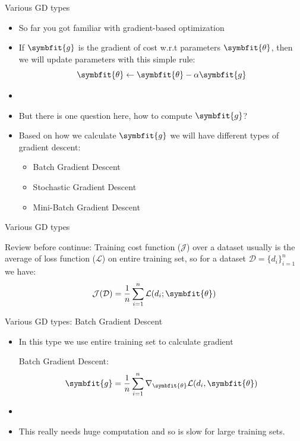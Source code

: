 \begin{frame}{Various GD types}
    \begin{itemize}
    	\item So far you got familiar with gradient-based optimization
    	\item If $\symbfit{g}$ is the gradient of cost w.r.t parameters $\symbfit{\theta}$, then we will update parameters with this simple rule:
    	\[
    	\symbfit{\theta} \gets \symbfit{\theta} - \alpha\symbfit{g}
    	\]
    	\item[]
    	\item But there is one question here, how to compute $\symbfit{g}$?
    	\item Based on how we calculate $\symbfit{g}$ we will have different types of gradient descent:
    	\begin{itemize}
    		\item Batch Gradient Descent
    		\item Stochastic Gradient Descent
    		\item Mini-Batch Gradient Descent
    	\end{itemize}
    \end{itemize}
\end{frame}

\begin{frame}{Various GD types}
	\begin{block}{Review before continue:}
		Training cost function ($\mathcal{J}$) over a dataset usually is the average of loss function ($\mathcal{L}$) on entire training set, so for a dataset $\mathcal{D}=\{d_i\}_{i=1}^n$ we have:
		\[
		\mathcal{J}(\mathcal{D}) = \frac{1}{n} \sum_{i=1}^{n} \mathcal{L}(d_i; \symbfit{\theta})
		\] 
	\end{block}
\end{frame}

\begin{frame}{Various GD types: Batch Gradient Descent}
	\begin{itemize}
		\item In this type we use {\color{newcolor}entire training set} to calculate gradient
		\begin{block}{Batch Gradient Descent:}
			\[
			\symbfit{g} = \frac{1}{n}\sum_{i=1}^n \nabla_{\symbfit{\theta}} \mathcal{L}(d_i, \symbfit{\theta})
			\]
		\end{block}
		\item[]
		\item This really needs huge computation and so is slow for large training sets.
	\end{itemize}
\end{frame}

